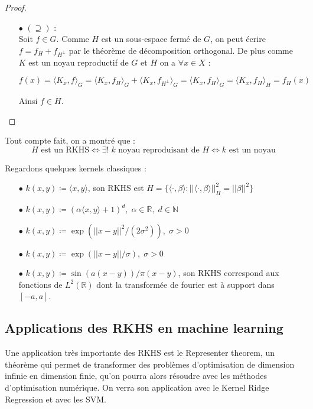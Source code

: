 \documentclass[a4paper, 11pt, french]{article}
\theoremstyle{definition}
\begin{document}
\begin{proof}
\begin{itemize}
			\item[$\bullet$]
			$(\supseteq)$ : \\
			Soit $f \in G$. Comme $H$ est un sous-espace fermé de $G$, on peut écrire $f = f_{H} + f_{H^\perp}$ par le théorème de décomposition orthogonal. De plus comme $K$ est un noyau reproductif de $G$ et $H$ on a $\forall x \in X$ :
			
			\[f(x) = \langle K_x, f \rangle_G = \langle K_x, f_{H} \rangle_G + \langle K_x, f_{H^\perp} \rangle_G = \langle K_x, f_{H} \rangle_G = \langle K_x, f_{H} \rangle_H = f_H (x) \]
			
			Ainsi $f \in H$.
		\end{itemize}	
	\end{proof}
	
	Tout compte fait, on a montré que :
	\[H \text{ est un RKHS} \Leftrightarrow \exists ! \; k \text{ noyau reproduisant de $H$} \Leftrightarrow k \text{ est un noyau}\]
	
	Regardons quelques kernels classiques :
	\begin{itemize}
		\item[$\bullet$] $k(x, y) \coloneqq \langle x, y \rangle$, son RKHS est $H = \{\langle \cdot, \beta \rangle : ||\langle \cdot, \beta \rangle||_H^2 = ||\beta||^2\}$
		\item[$\bullet$] $k(x, y) \coloneqq (\alpha \langle x, y \rangle + 1)^d, \; \alpha \in \mathbb{R}, \; d \in \mathbb{N}$
		\item[$\bullet$] $k(x, y) \coloneqq \exp(||x-y||^2 / (2\sigma^2)), \; \sigma > 0$
		\item[$\bullet$] $k(x, y) \coloneqq \exp(||x-y|| / \sigma), \; \sigma > 0$
		\item[$\bullet$] $k(x, y) \coloneqq \sin (a(x-y)) / \pi (x-y)$, son RKHS correspond aux fonctions de $L^2(\mathbb{R})$ dont la transformée de fourier est à support dans $[-a, a]$.
	\end{itemize}
	
	\subsection{Applications des RKHS en machine learning}
	
	Une application très importante des RKHS est le Representer theorem, un théorème qui permet de transformer des problèmes d'optimisation de dimension infinie en dimension finie, qu'on pourra alors résoudre avec les méthodes d'optimisation numérique. On verra son application avec le Kernel Ridge Regression et avec les SVM.
	
\end{document}
